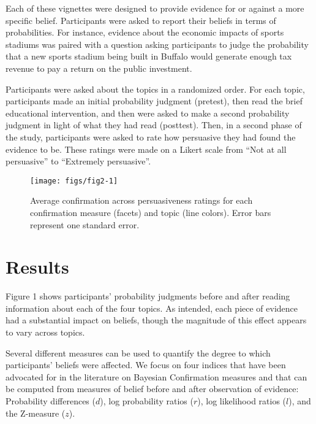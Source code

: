 \documentclass[10pt, letterpaper]{article}
\newenvironment{CodeChunk}{}{}
\begin{document}
Each of these vignettes were designed to provide evidence for or against
a more specific belief. Participants were asked to report their beliefs
in terms of probabilities. For instance, evidence about the economic
impacts of sports stadiums was paired with a question asking
participants to judge the probability that a new sports stadium being
built in Buffalo would generate enough tax revenue to pay a return on
the public investment.

Participants were asked about the topics in a randomized order. For each
topic, participants made an initial probability judgment (pretest), then
read the brief educational intervention, and then were asked to make a
second probability judgment in light of what they had read (posttest).
Then, in a second phase of the study, participants were asked to rate
how persuasive they had found the evidence to be. These ratings were
made on a Likert scale from ``Not at all persuasive'' to ``Extremely
persuasive''.

\begin{CodeChunk}
\begin{figure*}[htb]

{\centering \texttt{[image: figs/fig2-1]} 

}

\caption[Average confirmation across persuasiveness ratings for each confirmation measure (facets) and topic (line colors)]{Average confirmation across persuasiveness ratings for each confirmation measure (facets) and topic (line colors). Error bars represent one standard error.}\label{fig:fig2}
\end{figure*}
\end{CodeChunk}

\hypertarget{results}{%
\section{Results}\label{results}}

Figure 1 shows participants' probability judgments before and after
reading information about each of the four topics. As intended, each
piece of evidence had a substantial impact on beliefs, though the
magnitude of this effect appears to vary across topics.

Several different measures can be used to quantify the degree to which
participants' beliefs were affected. We focus on four indices that have
been advocated for in the literature on Bayesian Confirmation measures
and that can be computed from measures of belief before and after
observation of evidence: Probability differences (\(d\)), log
probability ratios (\(r\)), log likelihood ratios (\(l\)), and the
Z-measure (\(z\)).
\end{document}

